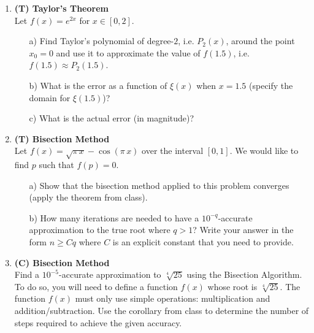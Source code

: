 \documentclass[12pt]{article}
\begin{document}
\begin{enumerate}[label=\bfseries Problem \arabic*:]



\item \textbf{(T) Taylor's Theorem}\\
Let $f(x)=e^{2x}$ for $x\in[0,2]$.

\begin{itemize} 
\item[a)] Find Taylor's polynomial of degree-$2$, i.e. $P_2(x)$, around the point $x_0=0$ and use it to approximate the value of $f(1.5)$, i.e. $f(1.5)\approx P_2(1.5)$. 


\item[b)]  What is the error as a function of $\xi(x)$ when $x=1.5$ (specify the domain for $\xi(1.5)$)?


\item[c)]  What is the actual error (in magnitude)?


\end{itemize}




\vspace{1em}
\item \textbf{(T) Bisection Method}\\
Let $f(x)=\sqrt{\pi\, x}-\cos(\pi\, x)$  over the interval $[0,1]$.  We would like to find $p$ such that $f(p)=0$.
\begin{itemize}
\item[a)] Show that the bisection method applied to this problem converges (apply the theorem from class).
  
\item[b)] How many iterations are needed to have a $10^{-q}$-accurate approximation to the true root where $q>1$? Write your answer in the form $n\geq C q$ where $C$ is an explicit constant that you need to provide.  
 
\end{itemize}



\vspace{1em}
\item \textbf{(C) Bisection Method}\\
Find a $10^{-5}$-accurate approximation to $\sqrt[4]{25}$ using the Bisection Algorithm. To do so, you will need to define a function $f(x)$ whose root is $\sqrt[4]{25}$. The function $f(x)$ must only use simple operations: multiplication and addition/subtraction. Use the corollary from class to determine the number of steps required to achieve the given accuracy.




\end{enumerate}
\end{document}
